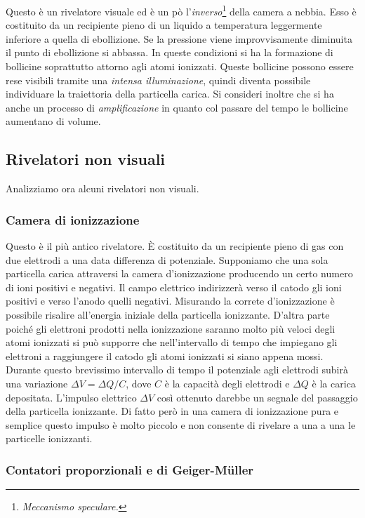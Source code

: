 Questo è un rivelatore visuale ed è un pò l'\textit{inverso}\footnote{\textit{Meccanismo speculare.} } della camera a nebbia. Esso è costituito da un recipiente pieno di un liquido a temperatura leggermente inferiore a quella di ebollizione. Se la pressione viene improvvisamente diminuita il punto di ebollizione si abbassa. In queste condizioni si ha la formazione di bollicine soprattutto attorno agli atomi ionizzati. Queste bollicine possono essere rese visibili tramite una \textit{intensa illuminazione}, quindi diventa possibile individuare la traiettoria della particella carica. Si consideri inoltre che si ha anche un processo di \textit{amplificazione} in quanto col passare del tempo le bollicine aumentano di volume.

\subsection{Rivelatori non visuali}
Analizziamo ora alcuni rivelatori non visuali.
\subsubsection{Camera di ionizzazione}

Questo è il più antico rivelatore. È costituito da un recipiente pieno di gas con due elettrodi a una data differenza di potenziale. Supponiamo che una sola particella carica attraversi la camera d'ionizzazione producendo un certo numero di ioni positivi e negativi. Il campo elettrico indirizzerà verso il catodo gli ioni positivi e verso l'anodo quelli negativi. Misurando la correte d'ionizzazione è possibile risalire all'energia iniziale della particella ionizzante. D'altra parte poiché gli elettroni prodotti nella ionizzazione saranno molto più veloci degli atomi ionizzati si può supporre che nell'intervallo di tempo che impiegano gli elettroni a raggiungere il catodo gli atomi ionizzati si siano appena mossi. Durante questo brevissimo intervallo di tempo il potenziale agli elettrodi subirà una variazione $\Delta V = \Delta Q / C$, dove $C$ è la capacità degli elettrodi e $\Delta Q$ è la carica depositata. L'impulso elettrico $\Delta V$ così ottenuto darebbe un segnale del passaggio della particella ionizzante. Di fatto però in una camera di ionizzazione pura e semplice questo impulso è molto piccolo e non consente di rivelare a una a una le particelle ionizzanti.

\subsubsection{Contatori proporzionali e di Geiger-M\"uller}

